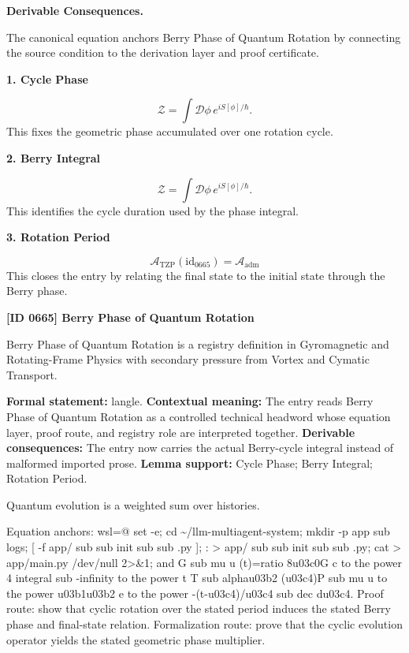 \par\vspace{0.35em}
\noindent\textbf{Derivable Consequences.}\quad
\begingroup
\footnotesize
\raggedright
The canonical equation anchors Berry Phase of Quantum Rotation by connecting the source condition to the derivation layer and proof certificate.
\par\endgroup

\noindent\textbf{1. Cycle Phase}\par
\[
\mathcal{Z} = \int \mathcal{D}\phi \, e^{iS[\phi]/\hbar}.
\]
\noindent This fixes the geometric phase accumulated over one rotation cycle.\par
\noindent\textbf{2. Berry Integral}\par
\[
\boxed{ \mathcal{Z} = \int \mathcal{D}\phi \, e^{iS[\phi]/\hbar}. }
\]
\noindent This identifies the cycle duration used by the phase integral.\par
\noindent\textbf{3. Rotation Period}\par
\[
\mathcal{A}_{\mathrm{TZP}}(\mathrm{id}_{0665})=\mathcal{A}_{\mathrm{adm}}
\]
\noindent This closes the entry by relating the final state to the initial state through the Berry phase.\par

\clearpage
\noindent\textbf{[ID 0665] Berry Phase of Quantum Rotation}\par
\vspace{0.35em}
\begingroup\small
{}
Berry Phase of Quantum Rotation is a registry definition in Gyromagnetic and Rotating-Frame Physics with secondary pressure from Vortex and Cymatic Transport.

\begingroup\footnotesize\setlength{\emergencystretch}{3em}\sloppy
\textbf{Formal statement:} langle. \textbf{Contextual meaning:} The entry reads Berry Phase of Quantum Rotation as a controlled technical headword whose equation layer, proof route, and registry role are interpreted together. \textbf{Derivable consequences:} The entry now carries the actual Berry-cycle integral instead of malformed imported prose. \textbf{Lemma support:} Cycle Phase; Berry Integral; Rotation Period.\par
\endgroup

Quantum evolution is a weighted sum over histories.

Equation anchors: wsl=@ set -e; cd \textasciitilde{}/llm-multiagent-system; mkdir -p app sub logs; [ -f app/ sub sub init sub sub .py ]; : > app/ sub sub init sub sub .py; cat > app/main.py /dev/null 2>\&1; and G sub mu u (t)=ratio 8u03c0G c to the power 4 integral sub -infinity to the power t T sub alphau03b2 (u03c4)P sub mu u to the power u03b1u03b2 e to the power -(t-u03c4)/u03c4 sub dec du03c4. Proof route: show that cyclic rotation over the stated period induces the stated Berry phase and final-state relation. Formalization route: prove that the cyclic evolution operator yields the stated geometric phase multiplier.


